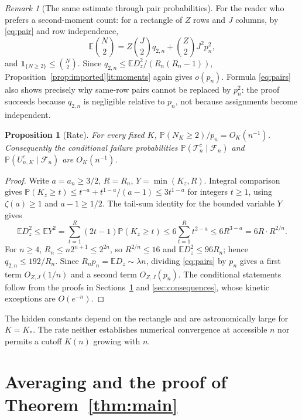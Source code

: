 \documentclass[11pt,letterpaper]{article}
\theoremstyle{plain}
\newtheorem{proposition}[theorem]{Proposition}
\theoremstyle{definition}
\theoremstyle{remark}
\newtheorem{remark}[theorem]{Remark}
\numberwithin{equation}{section}
\newcommand{\PP}{\mathbb P}
\newcommand{\EE}{\mathbb E}
\newcommand{\cF}{\mathcal F}
\newcommand{\cT}{\mathcal T}
\newcommand{\ind}{\mathbf 1}
\begin{document}
\begin{remark}[The same estimate through pair probabilities]\label{rem:pairs}
For the reader who prefers a second-moment count: for a rectangle of $Z$ rows and $J$ columns, by \eqref{eq:pair} and row independence,
\begin{equation}\label{eq:pairs}
 \EE\binom N2=Z\binom J2q_{2,n}+\binom Z2J^2p_n^2,
\end{equation}
and $\ind_{\{N\ge2\}}\le\binom N2$. Since $q_{2,n}\le\EE D_z^2/(R_n(R_n-1))$, Proposition~\ref{prop:imported}\ref{it:moments} again gives $o(p_n)$. Formula \eqref{eq:pairs} also shows precisely why same-row pairs cannot be replaced by $p_n^2$: the proof succeeds because $q_{2,n}$ is negligible relative to $p_n$, not because assignments become independent.
\end{remark}

\begin{proposition}[Rate]\label{prop:rate}
For every fixed $K$, $\PP(N_K\ge2)/p_n=O_K(n^{-1})$. Consequently the conditional failure probabilities $\PP(\cT_n^c\mid\cF_n)$ and $\PP(U_{n,K}^c\mid\cF_n)$ are $O_K(n^{-1})$.
\end{proposition}
\begin{proof}
Write $a=a_n\ge3/2$, $R=R_n$, $Y=\min(K_z,R)$. Integral comparison gives $\PP(K_z\ge t)\le t^{-a}+t^{1-a}/(a-1)\le3t^{1-a}$ for integers $t\ge1$, using $\zeta(a)\ge1$ and $a-1\ge1/2$. The tail-sum identity for the bounded variable $Y$ gives
\[
 \EE D_z^2\le\EE Y^2=\sum_{t=1}^{R}(2t-1)\PP(K_z\ge t)\le6\sum_{t=1}^Rt^{2-a}\le6R^{3-a}=6R\cdot R^{2/n} .
\]
For $n\ge4$, $R_n\le n2^{n+1}\le2^{2n}$, so $R^{2/n}\le16$ and $\EE D_z^2\le96R_n$; hence $q_{2,n}\le192/R_n$. Since $R_np_n=\EE D_z\sim\lambda n$, dividing \eqref{eq:pairs} by $p_n$ gives a first term $O_{Z,J}(1/n)$ and a second term $O_{Z,J}(p_n)$. The conditional statements follow from the proofs in Sections~\ref{sec:averaging} and \ref{sec:consequences}, whose kinetic exceptions are $O(e^{-n})$.
\end{proof}
The hidden constants depend on the rectangle and are astronomically large for $K=K_*$. The rate neither establishes numerical convergence at accessible $n$ nor permits a cutoff $K(n)$ growing with $n$.

\section{Averaging and the proof of Theorem~\ref{thm:main}}\label{sec:averaging}
\end{document}
